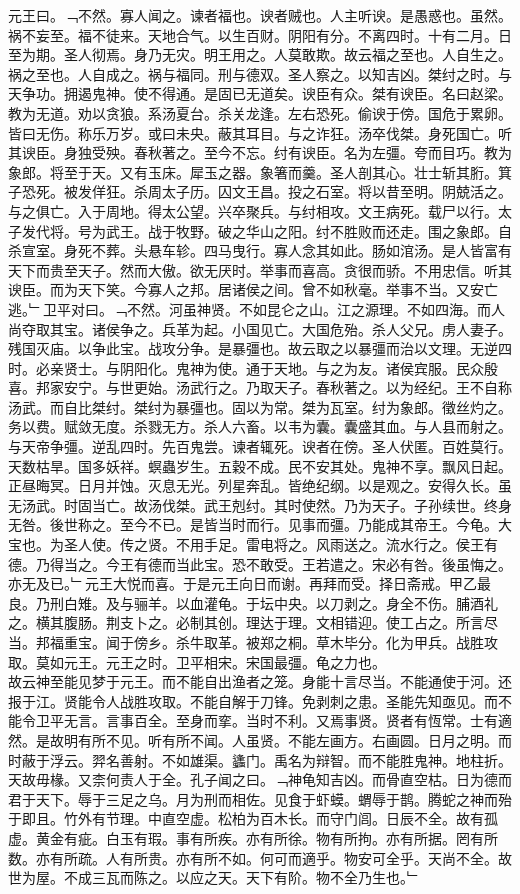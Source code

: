 \documentclass{zhvt-classic}
\begin{document}
\hspace*{2em}元王曰。﹁不然。寡人闻之。谏者福也。谀者贼也。人主听谀。是愚惑也。虽然。祸不妄至。福不徒来。天地合气。以生百财。阴阳有分。不离四时。十有二月。日至为期。圣人彻焉。身乃无灾。明王用之。人莫敢欺。故云福之至也。人自生之。祸之至也。人自成之。祸与福同。刑与德双。圣人察之。以知吉凶。桀纣之时。与天争功。拥遏鬼神。使不得通。是固已无道矣。谀臣有众。桀有谀臣。名曰赵梁。教为无道。劝以贪狼。系汤夏台。杀关龙逢。左右恐死。偷谀于傍。国危于累卵。皆曰无伤。称乐万岁。或曰未央。蔽其耳目。与之诈狂。汤卒伐桀。身死国亡。听其谀臣。身独受殃。春秋著之。至今不忘。纣有谀臣。名为左彊。夸而目巧。教为象郎。将至于天。又有玉床。犀玉之器。象箸而羹。圣人剖其心。壮士斩其胻。箕子恐死。被发佯狂。杀周太子历。囚文王昌。投之石室。将以昔至明。阴兢活之。与之俱亡。入于周地。得太公望。兴卒聚兵。与纣相攻。文王病死。载尸以行。太子发代将。号为武王。战于牧野。破之华山之阳。纣不胜败而还走。围之象郎。自杀宣室。身死不葬。头悬车轸。四马曳行。寡人念其如此。肠如涫汤。是人皆富有天下而贵至天子。然而大傲。欲无厌时。举事而喜高。贪很而骄。不用忠信。听其谀臣。而为天下笑。今寡人之邦。居诸侯之间。曾不如秋毫。举事不当。又安亡逃。﹂卫平对曰。﹁不然。河虽神贤。不如昆仑之山。江之源理。不如四海。而人尚夺取其宝。诸侯争之。兵革为起。小国见亡。大国危殆。杀人父兄。虏人妻子。残国灭庙。以争此宝。战攻分争。是暴彊也。故云取之以暴彊而治以文理。无逆四时。必亲贤士。与阴阳化。鬼神为使。通于天地。与之为友。诸侯宾服。民众殷喜。邦家安宁。与世更始。汤武行之。乃取天子。春秋著之。以为经纪。王不自称汤武。而自比桀纣。桀纣为暴彊也。固以为常。桀为瓦室。纣为象郎。徵丝灼之。务以费。赋敛无度。杀戮无方。杀人六畜。以韦为囊。囊盛其血。与人县而射之。与天帝争彊。逆乱四时。先百鬼尝。谏者辄死。谀者在傍。圣人伏匿。百姓莫行。天数枯旱。国多妖祥。螟蟲岁生。五穀不成。民不安其处。鬼神不享。飘风日起。正昼晦冥。日月并蚀。灭息无光。列星奔乱。皆绝纪纲。以是观之。安得久长。虽无汤武。时固当亡。故汤伐桀。武王剋纣。其时使然。乃为天子。子孙续世。终身无咎。後世称之。至今不已。是皆当时而行。见事而彊。乃能成其帝王。今龟。大宝也。为圣人使。传之贤。不用手足。雷电将之。风雨送之。流水行之。侯王有德。乃得当之。今王有德而当此宝。恐不敢受。王若遣之。宋必有咎。後虽悔之。亦无及已。﹂元王大悦而喜。于是元王向日而谢。再拜而受。择日斋戒。甲乙最良。乃刑白雉。及与骊羊。以血灌龟。于坛中央。以刀剥之。身全不伤。脯酒礼之。横其腹肠。荆支卜之。必制其创。理达于理。文相错迎。使工占之。所言尽当。邦福重宝。闻于傍乡。杀牛取革。被郑之桐。草木毕分。化为甲兵。战胜攻取。莫如元王。元王之时。卫平相宋。宋国最彊。龟之力也。\\
\hspace*{2em}故云神至能见梦于元王。而不能自出渔者之笼。身能十言尽当。不能通使于河。还报于江。贤能令人战胜攻取。不能自解于刀锋。免剥刺之患。圣能先知亟见。而不能令卫平无言。言事百全。至身而挛。当时不利。又焉事贤。贤者有恆常。士有適然。是故明有所不见。听有所不闻。人虽贤。不能左画方。右画圆。日月之明。而时蔽于浮云。羿名善射。不如雄渠。蠭门。禹名为辩智。而不能胜鬼神。地柱折。天故毋椽。又柰何责人于全。孔子闻之曰。﹁神龟知吉凶。而骨直空枯。日为德而君于天下。辱于三足之乌。月为刑而相佐。见食于虾蟆。蝟辱于鹊。腾蛇之神而殆于即且。竹外有节理。中直空虚。松柏为百木长。而守门闾。日辰不全。故有孤虚。黄金有疵。白玉有瑕。事有所疾。亦有所徐。物有所拘。亦有所据。罔有所数。亦有所疏。人有所贵。亦有所不如。何可而適乎。物安可全乎。天尚不全。故世为屋。不成三瓦而陈之。以应之天。天下有阶。物不全乃生也。﹂\\
\end{document}
